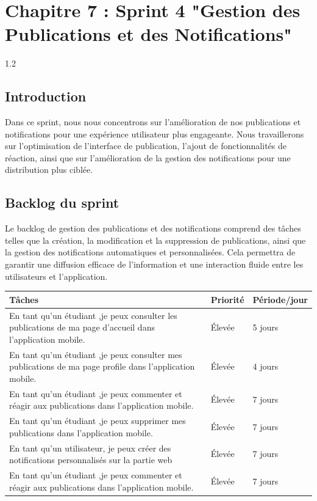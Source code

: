 \chapter{ Chapitre 7 : Sprint 4 "Gestion \centering des Publications   et des Notifications"}
\begin{spacing}{1.2}
\minitoc
\thispagestyle{MyStyle}
\end{spacing}
\newpage
\begin{sloppypar} 

\section{Introduction }
\vspace{-4mm}
Dans ce sprint, nous nous concentrons sur l'amélioration de nos publications et notifications pour une expérience utilisateur plus engageante. Nous travaillerons sur l'optimisation de l'interface de publication, l'ajout de fonctionnalités de réaction, ainsi que sur l'amélioration de la gestion des notifications pour une distribution plus ciblée. 

\vspace{-1cm}
\section{Backlog du sprint}
\vspace{-4mm}
Le backlog de gestion des publications et des notifications comprend des tâches telles que la création, la modification et la suppression de publications, ainsi que la gestion des notifications automatiques et personnalisées. Cela permettra de garantir une diffusion efficace de l'information et une interaction fluide entre les utilisateurs et l'application.
\vspace{-1mm}
\begin{table}[h]
\centering
\begin{tabular}{|p{8cm}|p{3cm}|p{3cm}|}
\hline
\textbf{ Tâches } & \textbf{ Priorité }& \textbf{Période/jour}  \\
\hline En tant qu’un étudiant ,je peux consulter les publications de ma page d’accueil dans l’application mobile.& Élevée  & 5 jours \\
\hline En tant qu’un étudiant ,je peux consulter mes publications de ma page profile dans l’application mobile.  & Élevée  & 4 jours  \\
\hline En tant qu’un étudiant ,je peux commenter et réagir aux publications dans l’application mobile.  & Élevée  & 7 jours  \\
\hline En tant qu’un étudiant ,je peux supprimer mes publications dans l’application mobile.  & Élevée  & 7 jours  \\
\hline En tant qu'un utilisateur, je peux créer  des notifications personnalisés  sur la partie web  & Élevée  & 7 jours  \\
\hline En tant qu’un étudiant ,je peux commenter et réagir aux publications dans l’application mobile.  & Élevée  & 7 jours  \\
\hline


\end{tabular}
\end{table}
\end{sloppypar}
